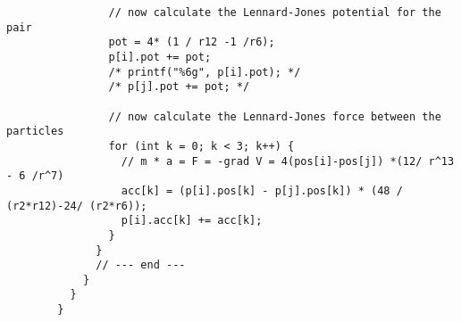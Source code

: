 \begin{lstlisting}
                // now calculate the Lennard-Jones potential for the pair
                pot = 4* (1 / r12 -1 /r6);
                p[i].pot += pot;
                /* printf("%6g", p[i].pot); */
                /* p[j].pot += pot; */
        
                // now calculate the Lennard-Jones force between the particles
                for (int k = 0; k < 3; k++) {
                  // m * a = F = -grad V = 4(pos[i]-pos[j]) *(12/ r^13 - 6 /r^7)
                  acc[k] = (p[i].pos[k] - p[j].pos[k]) * (48 / (r2*r12)-24/ (r2*r6));
                  p[i].acc[k] += acc[k];
                }
              }
              // --- end ---
            }
          }
        }\end{lstlisting}

